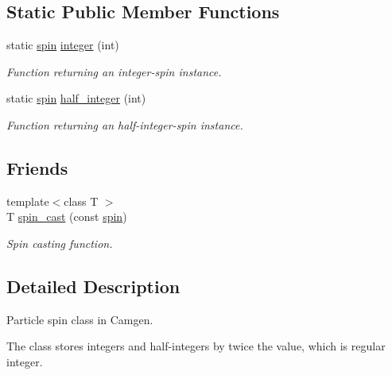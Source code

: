 \subsection*{Static Public Member Functions}
\begin{DoxyCompactItemize}
\item 
\hypertarget{a00501_a0e5f5225bd6ca5ec2bbf8c0719647159}{static \hyperlink{a00501}{spin} \hyperlink{a00501_a0e5f5225bd6ca5ec2bbf8c0719647159}{integer} (int)}\label{a00501_a0e5f5225bd6ca5ec2bbf8c0719647159}

\begin{DoxyCompactList}\small\item\em Function returning an integer-\/spin instance. \end{DoxyCompactList}\item 
static \hyperlink{a00501}{spin} \hyperlink{a00501_a40589d046e20aac5764095a7d0b0cfdf}{half\-\_\-integer} (int)
\begin{DoxyCompactList}\small\item\em Function returning an half-\/integer-\/spin instance. \end{DoxyCompactList}\end{DoxyCompactItemize}
\subsection*{Friends}
\begin{DoxyCompactItemize}
\item 
\hypertarget{a00501_a53097258d49559d28f326539ead5dbf8}{{\footnotesize template$<$class T $>$ }\\T \hyperlink{a00501_a53097258d49559d28f326539ead5dbf8}{spin\-\_\-cast} (const \hyperlink{a00501}{spin})}\label{a00501_a53097258d49559d28f326539ead5dbf8}

\begin{DoxyCompactList}\small\item\em Spin casting function. \end{DoxyCompactList}\end{DoxyCompactItemize}


\subsection{Detailed Description}
Particle spin class in Camgen. 

The class stores integers and half-\/integers by twice the value, which is regular integer. 

